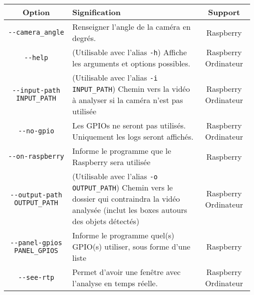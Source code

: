 \begin{table}[H]
    \centering
    \begin{tabularx}{\linewidth}{|c|X|c|}
        \hline
        \rowcolor{tableColorDark} Option              & Signification                                                                                                                                              & Support              \\
        \hline
        \texttt{-{}-camera\_angle}                    & Renseigner l'angle de la caméra en degrés.                                                                                                                 & Raspberry            \\\hline
        \texttt{-{}-help}                             & (Utilisable avec l'alias \texttt{-h}) Affiche les arguments et options possibles.                                                                          & Raspberry Ordinateur \\\hline
        \texttt{-{}-input-path INPUT\_PATH}           & (Utilisable avec l'alias \texttt{-i INPUT\_PATH}) Chemin vers la vidéo à analyser si la caméra n'est pas utilisée                                          & Raspberry Ordinateur \\\hline
        \texttt{-{}-no-gpio}                          & Les GPIOs ne seront pas utilisés. Uniquement les logs seront affichés.                                                                                     & Raspberry Ordinateur \\\hline
        \texttt{-{}-on-raspberry}                     & Informe le programme que le Raspberry sera utilisée                                                                                                        & Raspberry            \\\hline
        \texttt{-{}-output-path OUTPUT\_PATH}         & (Utilisable avec l'alias \texttt{-o OUTPUT\_PATH}) Chemin vers le dossier qui contraindra la vidéo analysée (inclut les boxes autours des objets détectés) & Raspberry Ordinateur \\\hline
        \texttt{-{}-panel-gpios PANEL\_GPIOS}         & Informe le programme quel(s) GPIO(s) utiliser, sous forme d'une liste                                                                                      & Raspberry            \\\hline
        \texttt{-{}-see-rtp}                          & Permet d'avoir une fenêtre avec l'analyse en temps réelle.                                                                                                 & Raspberry Ordinateur \\\hline

\end{tabularx}
\end{table}
